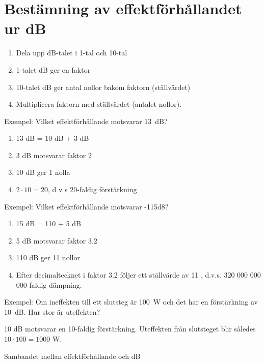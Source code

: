 \section{Bestämning av effektförhållandet ur dB}

\begin{rev-raderas}

\begin{enumerate}
\item Dela upp dB-talet i 1-tal och 10-tal
\item 1-talet dB ger en faktor
\item 10-talet dB ger antal nollor bakom faktorn (ställvärdet)
\item Multiplicera faktorn med ställvärdet (antalet nollor).
\end{enumerate}

Exempel: Vilket effektförhållande motsvarar 13~dB?

\begin{enumerate}
\item 13 dB = 10 dB + 3 dB
\item 3 dB motsvarar faktor 2
\item 10 dB ger 1 nolla
\item \(2 \cdot 10 = 20\), d v s 20-faldig förstärkning
\end{enumerate}

Exempel: Vilket effektförhållande motsvarar -115d8?
\begin{enumerate}
\item 15 dB = 110 + 5 dB
\item 5 dB motsvarar faktor 3.2
\item 110 dB ger 11 nollor
\item Efter decimaltecknet i faktor 3.2 följer ett ställvärde av 11 ,
  d.v.s. 320 000 000 000-faldig dämpning.
\end{enumerate}

Exempel: Om ineffekten till ett slutsteg är 100~W och det har en
förstärkning av 10~dB. Hur stor är uteffekten?

10 dB motsvarar en 10-faldig förstärkning.  Uteffekten från slutsteget
blir således \(10 \cdot 100 = 1000\) W.

Sambandet mellan effektförhållande och dB


\end{rev-raderas}
